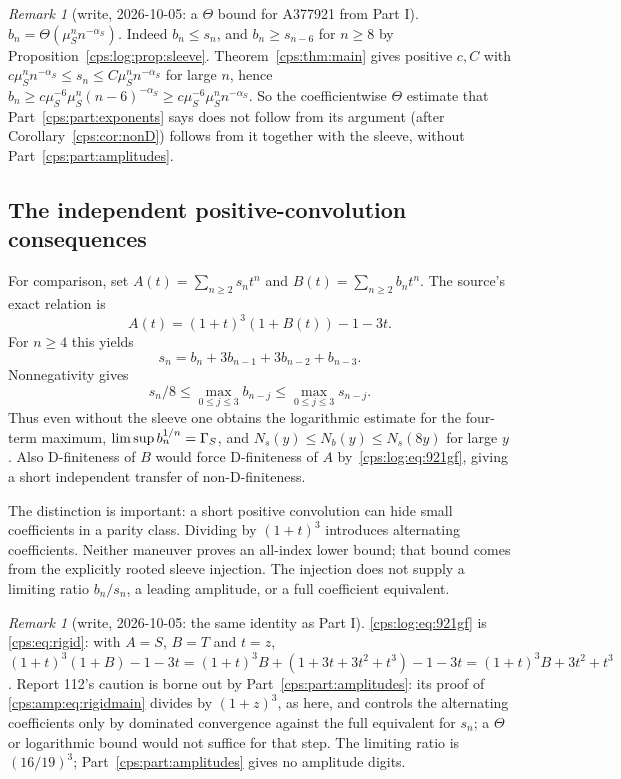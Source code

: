 \documentclass[11pt,letterpaper]{article}
\numberwithin{equation}{section}
\theoremstyle{remark}\newtheorem{remark}[theorem]{Remark}
\begin{document}
\begin{remark}[write, 2026-10-05: a $\Theta$ bound for A377921 from Part I]\label{cps:log:rem:theta}
\emph{$b_n=\Theta(\mu_S^nn^{-\alpha_S})$.} Indeed $b_n\le s_n$, and $b_n\ge s_{n-6}$ for $n\ge8$ by
Proposition~\ref{cps:log:prop:sleeve}. Theorem~\ref{cps:thm:main} gives positive $c,C$ with
$c\mu_S^nn^{-\alpha_S}\le s_n\le C\mu_S^nn^{-\alpha_S}$ for large $n$, hence
$b_n\ge c\mu_S^{-6}\mu_S^n(n-6)^{-\alpha_S}\ge c\mu_S^{-6}\mu_S^nn^{-\alpha_S}$. So the coefficientwise
$\Theta$ estimate that Part~\ref{cps:part:exponents} says does not follow from its argument
(after Corollary~\ref{cps:cor:nonD}) follows from it together with the sleeve, without
Part~\ref{cps:part:amplitudes}.
\end{remark}

\subsection{The independent positive-convolution consequences}
For comparison, set $A(t)=\sum_{n\ge2}s_nt^n$ and
$B(t)=\sum_{n\ge2}b_nt^n$. The source's exact relation
\cite[Remark 20]{FNS} is
\begin{equation}\label{cps:log:eq:921gf}
 A(t)=(1+t)^3(1+B(t))-1-3t.
\end{equation}
For $n\ge4$ this yields
\begin{equation}\label{cps:log:eq:921conv}
 s_n=b_n+3b_{n-1}+3b_{n-2}+b_{n-3}.
\end{equation}
Nonnegativity gives
\[
 s_n/8\le\max_{0\le j\le3}b_{n-j}
        \le\max_{0\le j\le3}s_{n-j}.
\]
Thus even without the sleeve one obtains the logarithmic estimate
for the four-term maximum, $\limsup b_n^{1/n}=\Gamma_S$, and
$N_s(y)\le N_b(y)\le N_s(8y)$ for large $y$. Also D-finiteness of
$B$ would force D-finiteness of $A$ by~\eqref{cps:log:eq:921gf}, giving a
short independent transfer of non-D-finiteness.

The distinction is important: a short positive convolution can
hide small coefficients in a parity class. Dividing by $(1+t)^3$
introduces alternating coefficients. Neither maneuver proves an
all-index lower bound; that bound comes from the explicitly rooted
sleeve injection. The injection does not supply a limiting ratio
$b_n/s_n$, a leading amplitude, or a full coefficient equivalent.

\begin{remark}[write, 2026-10-05: the same identity as Part I]\label{cps:log:rem:rigid}
\eqref{cps:log:eq:921gf} is \eqref{cps:eq:rigid}: with $A=S$, $B=T$ and $t=z$,
$(1+t)^3(1+B)-1-3t=(1+t)^3B+(1+3t+3t^2+t^3)-1-3t=(1+t)^3B+3t^2+t^3$. Report 112's caution is
borne out by Part~\ref{cps:part:amplitudes}: its proof of \eqref{cps:amp:eq:rigidmain} divides by
$(1+z)^3$, as here, and controls the alternating coefficients only by dominated convergence
against the full equivalent for $s_n$; a $\Theta$ or logarithmic bound would not suffice for that
step. The limiting ratio is $(16/19)^3$; Part~\ref{cps:part:amplitudes} gives no amplitude digits.
\end{remark}
\end{document}
